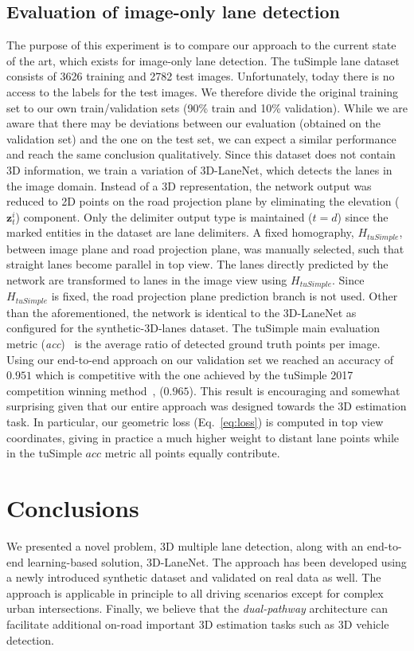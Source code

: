 \documentclass[10pt,twocolumn,letterpaper]{article}
\begin{document}
\subsection{Evaluation of image-only lane detection}

The purpose of this experiment is to compare our approach to the current state of the art, which exists for image-only lane detection. The tuSimple lane dataset~\cite{tu_simple} consists of 3626 training and 2782 test images. Unfortunately, today there is no access to the labels for the test images. We therefore divide the original training set to our own train/validation sets (90\% train and 10\% validation). While we are aware that there may be deviations between our evaluation (obtained on the validation set) and the one on the test set, we can expect a similar performance and reach the same conclusion qualitatively. Since this dataset does not contain 3D information, we train a variation of 3D-LaneNet, which detects the lanes in the image domain. Instead of a 3D representation, the network output was reduced to 2D points on the road projection plane by eliminating the elevation ($\mathbf{z}_t^i$) component. Only the delimiter output type is maintained ($t=d$) since the marked entities in the dataset are lane delimiters. A fixed homography, $H_{tuSimple}$, between image plane and road projection plane, was manually selected, such that straight lanes become parallel in top view. The lanes directly predicted by the network are transformed to lanes in the image view using $H_{tuSimple}$. Since $H_{tuSimple}$ is fixed, the road projection plane prediction branch is not used. Other than the aforementioned, the network is identical to the 3D-LaneNet as configured for the synthetic-3D-lanes dataset. The tuSimple main evaluation metric (\textit{acc})~\cite{tu_simple} is the average ratio of detected ground truth points per image. Using our end-to-end approach on our validation set we reached an accuracy of $0.951$ which is competitive with the one achieved by the tuSimple 2017 competition winning method~\cite{SCNN}, ($0.965$). This result is encouraging and somewhat surprising given that our entire approach was designed towards the 3D estimation task. In particular, our geometric loss (Eq.~\ref{eq:loss}) is computed in top view coordinates, giving in practice a much higher weight to distant lane points while in the tuSimple $acc$ metric all points equally contribute.





\section{Conclusions}
We presented a novel problem, 3D multiple lane detection, along with an end-to-end learning-based solution, 3D-LaneNet. The approach has been developed using a newly introduced synthetic dataset and validated on real data as well. The approach is applicable in principle to all driving scenarios except for complex urban intersections. Finally, we believe that the \textit{dual-pathway} architecture can facilitate additional on-road important 3D estimation tasks such as 3D vehicle detection.
{
	\small
	
	
}
\end{document}

